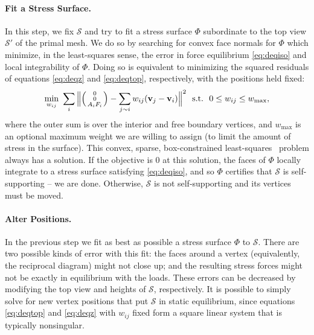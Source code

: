 \documentclass[annual]{acmsiggraph}
\makeatletter
\def\Forcevector{\Big(\mbox{\scriptsize
	\def\arraystretch{0.8}\begin{tabular}{@{\,}c@{\,}}
	0 \\ 0 \\ $A_i F_i$
	\end{tabular}}\Big)}
\def\SS{{\mathcal S}}
\makeatother
\begin{document}
\paragraph{Fit a Stress Surface.} In this step, we fix $\SS$ and try to 
fit a stress surface $\Phi$ subordinate to the top view $\SS'$ of the 
primal mesh. We do so by searching for convex face normals for $\Phi$ 
which minimize, in the least-squares sense, the error in force equilibrium 
\eqref{eq:deqiso} and local integrability of $\Phi$. Doing so is 
equivalent to minimizing the squared residuals of equations 
\eqref{eq:deqz} and \eqref{eq:deqtop}, respectively, with the positions 
held fixed:
	\begin{align}
	\min_{w_{ij}}\ 
	\sum_i 
	\Big\| \Forcevector -
		\sum_{j\sim i} w_{ij} (\vw_j-\vw_i) \Big\|^2
	\ \
	\textrm{s.t.}\ \
		0 \leq w_{ij} \leq w_{\max}, \label{eq:wbounds}
\end{align}
 where the outer sum is over the interior and free boundary vertices, and 
$w_\textrm{max}$ is an optional maximum weight we are willing to assign 
(to limit the amount of stress in the surface). This convex, sparse, 
box-constrained least-squares~\cite{BCLS} problem always has a solution. If the 
objective is $0$ at this solution, the faces of $\Phi$ locally integrate 
to a stress surface satisfying \eqref{eq:deqiso}, and so $\Phi$ certifies 
that $\SS$ is self-supporting -- we are done. Otherwise, $\SS$ is not 
self-supporting and its vertices must be moved.

\paragraph{Alter Positions.} In the previous step we fit as best as 
possible a stress surface $\Phi$ to $\SS$. There are two possible kinds of 
error with this fit: the faces around a vertex (equivalently, the 
reciprocal diagram) might not close up; and the resulting stress forces 
might not be exactly in equilibrium with the loads. These errors can be 
decreased by modifying the top view and heights of $\SS$, respectively. It 
is possible to simply solve for new vertex positions that put $\SS$ in 
static equilibrium, since equations \eqref{eq:deqtop} and \eqref{eq:deqz} 
with $w_{ij}$ fixed form a square linear system that is typically 
nonsingular.
\end{document}
